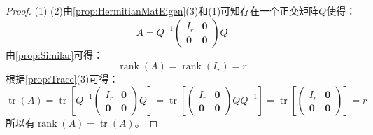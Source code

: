 \begin{proof}
	(1)
	(2)由\cref{prop:HermitianMatEigen}(3)和(1)可知存在一个正交矩阵$Q$使得：
	\begin{equation*}
		A=Q^{-1}
		\begin{pmatrix}
			I_r & \mathbf{0} \\
			\mathbf{0} & \mathbf{0}
		\end{pmatrix}Q
	\end{equation*}
	由\cref{prop:Similar}可得：
	\begin{equation*}
		\operatorname{rank}(A)=\operatorname{rank}(I_r)=r
	\end{equation*}
	根据\cref{prop:Trace}(3)可得：
	\begin{equation*}
		\operatorname{tr}(A)=\operatorname{tr}\left[Q^{-1}
		\begin{pmatrix}
			I_r & \mathbf{0} \\
			\mathbf{0} & \mathbf{0}
		\end{pmatrix}Q\right]
		=\operatorname{tr}\left[
		\begin{pmatrix}
			I_r & \mathbf{0} \\
			\mathbf{0} & \mathbf{0}
		\end{pmatrix}QQ^{-1}\right]
		=\operatorname{tr}\left[
		\begin{pmatrix}
			I_r & \mathbf{0} \\
			\mathbf{0} & \mathbf{0}
		\end{pmatrix}\right]
		=r
	\end{equation*}
	所以有$\operatorname{rank}(A)=\operatorname{tr}(A)$。
\end{proof}
